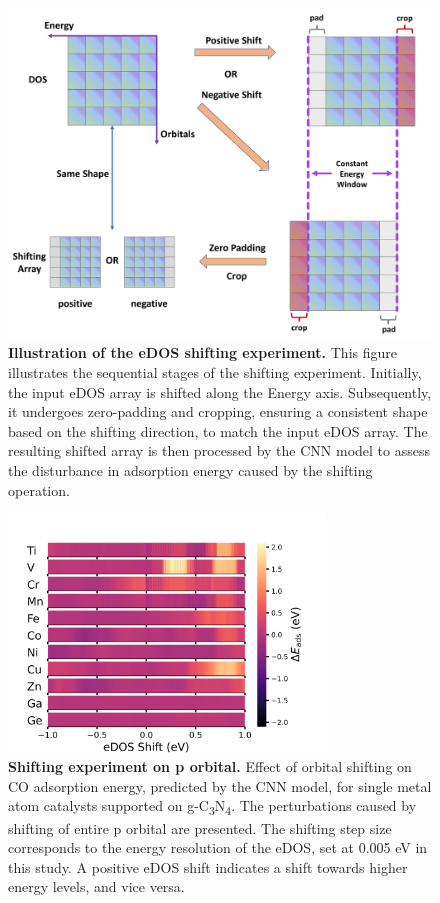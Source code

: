 \documentclass[a4paper, 12pt]{article}
\begin{document}
\begin{figure}[htbp]
  \centering
  \includegraphics[width=\textwidth]{supp_fig30_shifting.png}
  \caption{\textbf{Illustration of the eDOS shifting experiment.}
  This figure illustrates the sequential stages of the shifting experiment.
  Initially, the input eDOS array is shifted along the Energy axis.
  Subsequently, it undergoes zero-padding and cropping,
  ensuring a consistent shape based on the shifting direction, to match the input eDOS array.
  The resulting shifted array is then processed by the CNN model to
  assess the disturbance in adsorption energy caused by the shifting operation.}
  \label{supp_fig30:shifting}
\end{figure}

\begin{figure}[htbp]
  \centering
  \includegraphics[width=0.75\textwidth]{supp_fig31_p_shifting.png}
  \caption{\textbf{Shifting experiment on p orbital.}
  Effect of orbital shifting on CO adsorption energy, predicted by the CNN model,
  for single metal atom catalysts supported on g-C\textsubscript{3}N\textsubscript{4}.
  The perturbations caused by shifting of entire p orbital are presented.
  The shifting step size corresponds to the energy resolution of the eDOS, set at 0.005 eV in this study.
  A positive eDOS shift indicates a shift towards higher energy levels, and vice versa.}
  \label{supp_fig31:p_shifting}
\end{figure}
\end{document}
